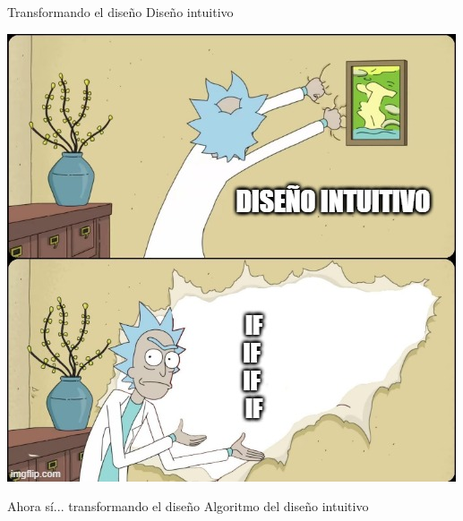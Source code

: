 \begin{frame}{Transformando el dise\~no}
    \centering
    \Huge \textcolor{blue3}{Dise\~no intuitivo}
\end{frame}

{
{
    \includegraphics[width=\paperwidth,height=\paperheight]{img/algorithm.jpg}
}
\begin{frame}
\end{frame}
}


\begin{frame}{Ahora s\'i... transformando el dise\~no}
    \centering
    \Huge \textcolor{blue3}{Algoritmo del dise\~no intuitivo}
\end{frame}


